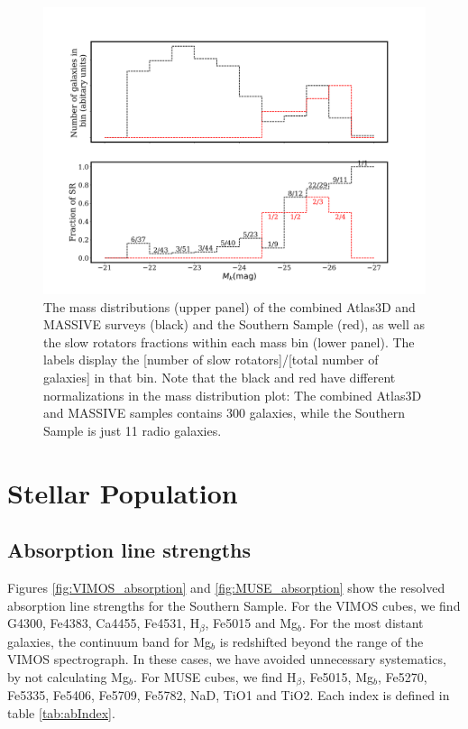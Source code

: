 		\begin{figure}
			\centering
			\includegraphics[width=\textwidth]{chapter4/M_k_binned.png}
			\caption[Mass matching global kinematics]{The mass distributions (upper panel) of the combined Atlas3D and MASSIVE surveys (black) and the Southern Sample (red), as well as the slow rotators fractions within each mass bin (lower panel). The labels display the [number of slow rotators]/[total number of galaxies] in that bin. Note that the black and red have different normalizations in the mass distribution plot: The combined Atlas3D and MASSIVE samples contains 300 galaxies, while the Southern Sample is just 11 radio galaxies.}
			\label{fig:SRmassFraction}
		\end{figure}







\section{Stellar Population}
	\label{sec:pop}

	\subsection{Absorption line strengths}
		Figures \ref{fig:VIMOS_absorption} and \ref{fig:MUSE_absorption} show the resolved absorption line strengths for the Southern Sample. For the VIMOS cubes, we find G4300, Fe4383, Ca4455, Fe4531, H$_\beta$, Fe5015 and Mg$_b$. For the most distant galaxies, the continuum band for Mg$_b$ is redshifted beyond the range of the VIMOS spectrograph. In these cases, we have avoided unnecessary systematics, by not calculating Mg$_b$. For MUSE cubes, we find H$_\beta$, Fe5015, Mg$_b$, Fe5270, Fe5335, Fe5406, Fe5709, Fe5782, NaD, TiO1 and TiO2. Each index is defined in table \ref{tab:abIndex}. 

